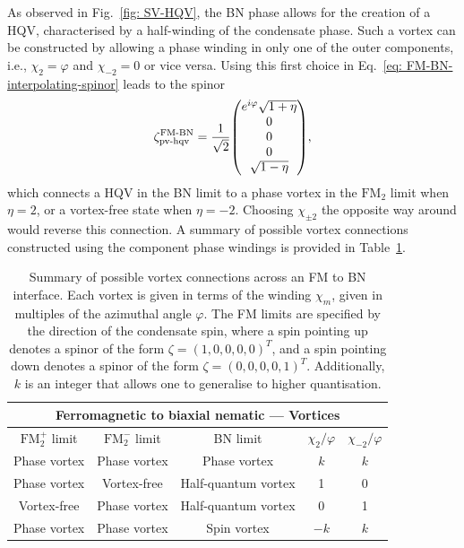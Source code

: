 As observed in Fig.~\ref{fig: SV-HQV}, the BN phase allows for the creation
of a HQV, characterised by a half-winding of the condensate phase.
Such a vortex can be constructed by allowing a phase winding in only one of the
outer components, i.e., \(\chi_2 = \varphi \) and \(\chi_{-2} = 0\) or vice
versa.
Using this first choice in Eq.~\eqref{eq: FM-BN-interpolating-spinor} leads to
the spinor
\begin{align}\label{eq: FM-BN-pv-hqv}
    \zeta^\text{FM-BN}_\text{pv-hqv} = \frac{1}{\sqrt{2}}\mqty(
    e^{i\varphi} \sqrt{1 + \eta} \\
    0 \\
    0 \\
    0 \\
    \sqrt{1 - \eta}),
\end{align}
which connects a HQV in the BN limit to a phase vortex in the \(\text{FM}_2\)
limit when \(\eta = 2\), or a vortex-free state when \(\eta = -2\).
Choosing \(\chi_{\pm 2}\) the opposite way around would reverse this connection.
A summary of possible vortex connections constructed using the component phase
windings is provided in Table~\ref{tab: FM-BN-vortices}.
\begin{table}
    \centering
    \begin{tabular}{ccccc}
        \toprule
        \multicolumn{5}{c}{Ferromagnetic to biaxial nematic --- Vortices} \\
        \midrule
        \(\text{FM}_2^+\) limit & \(\text{FM}_2^-\) limit & BN limit
            & \(\chi_2/\varphi \) & \(\chi_{-2}/\varphi \)  \\
        \midrule
         Phase vortex & Phase vortex & Phase vortex & \(k\) & \(k\) \\ 
         Phase vortex & Vortex-free & Half-quantum vortex & 1 & 0 \\
         Vortex-free & Phase vortex & Half-quantum vortex & 0 & 1 \\
         Phase vortex & Phase vortex & Spin vortex  & \(-k\) & \(k\) \\
        \bottomrule
    \end{tabular}
    \caption[Examples of possible vortex connections across a ferromagnetic
    to biaxial nematic interface]{\label{tab: FM-BN-vortices}
    Summary of possible vortex connections across an FM to BN interface.
    Each vortex is given in terms of the winding \(\chi_m\), given in multiples
    of the azimuthal angle \(\varphi \).
    The FM limits are specified by the direction of the condensate spin, where
    a spin pointing up denotes a spinor of the form
    \(\zeta={(1, 0, 0, 0, 0)}^T\), and a spin pointing down denotes a spinor of
    the form \(\zeta={(0, 0, 0, 0, 1)}^T\).
    Additionally, \(k\) is an integer that allows one to generalise to higher
    quantisation.}
\end{table}


